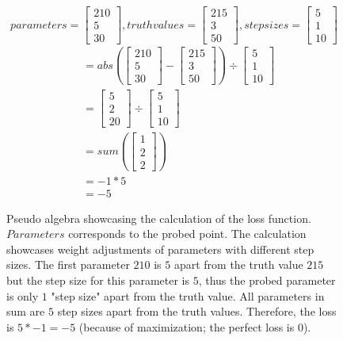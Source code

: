 \begin{figure}
    \centering
    \[parameters =  \begin{bmatrix}
    210 \\
    5 \\
    30 
    \end{bmatrix}, 
    truth values = \begin{bmatrix}
    215 \\
    3 \\
    50 
    \end{bmatrix},
    step sizes = \begin{bmatrix}
    5 \\
    1 \\
    10 
    \end{bmatrix}
    \]
    \begin{align} 
    &=  abs(\begin{bmatrix}
    210 \\
    5 \\
    30 
    \end{bmatrix} -
    \begin{bmatrix}
    215 \\
    3 \\
    50 
    \end{bmatrix}) \div
    \begin{bmatrix}
    5 \\
    1 \\
    10 
    \end{bmatrix} \\
    &= \begin{bmatrix}
    5 \\
    2 \\
    20 
    \end{bmatrix} \div \begin{bmatrix}
    5 \\
    1 \\
    10 
    \end{bmatrix} \\
    &= sum(\begin{bmatrix}
    1 \\
    2 \\
    2 
    \end{bmatrix}) \\
    &= -1 * 5 \\
    &= -5
    \end{align}
    
    \caption{Pseudo algebra showcasing the calculation of the loss function. $Parameters$ corresponds to the probed point. The calculation showcases weight adjustments of parameters with different step sizes. The first parameter $210$ is $5$ apart from the truth value $215$ but the step size for this parameter is $5$, thus the probed parameter is only $1$ "step size" apart from the truth value. All parameters in sum are $5$ step sizes apart from the truth values. Therefore, the loss is $5 *-1 = -5$ (because of maximization; the perfect loss is 0).}
    \label{figure:loss_function_example}
\end{figure}    


